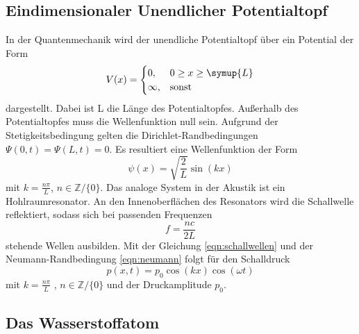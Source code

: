 \subsection{Eindimensionaler Unendlicher Potentialtopf}
In der Quantenmechanik wird der unendliche Potentialtopf über ein Potential der Form
\begin{equation}
    V(x) = 
    \begin{cases}
        0 ,
        & 0 \ge x \ge \symup{L} \\
        \infty , & \text{sonst}
    \end{cases}
\end{equation}
dargestellt. Dabei ist L die Länge des Potentialtopfes. Außerhalb des Potentialtopfes muss die Wellenfunktion null sein.
Aufgrund der Stetigkeitsbedingung gelten die Dirichlet-Randbedingungen $\Psi(0,t) = \Psi(L,t) =0$.
Es resultiert eine Wellenfunktion der Form
\begin{equation}
    \psi(x) = \sqrt{\frac{2}{L}} \sin(kx)
    \label{eqn:psitopf}
\end{equation}
mit $k = \frac{n \pi}{L}$, $n \in \mathbb{Z}/\{0\}$.
Das analoge System in der Akustik ist ein Hohlraumresonator. An den Innenoberflächen des Resonators wird die Schallwelle reflektiert, sodass 
sich bei passenden Frequenzen
\begin{equation}
    f = \frac{n c}{2 L}
    \label{eqn:resonanzlin}
\end{equation}
stehende Wellen ausbilden.
Mit der Gleichung \ref{eqn:schallwellen} und der Neumann-Randbedingung \ref{eqn:neumann}
folgt für den Schalldruck
\begin{equation}
    p(x,t) = p_0 \cos(kx) \cos(\omega t)
\end{equation}
mit $k = \frac{n\pi}{L}$ , $n \in \mathbb{Z}/\{0\}$ und der Druckamplitude $p_0$.

\subsection{Das Wasserstoffatom}
